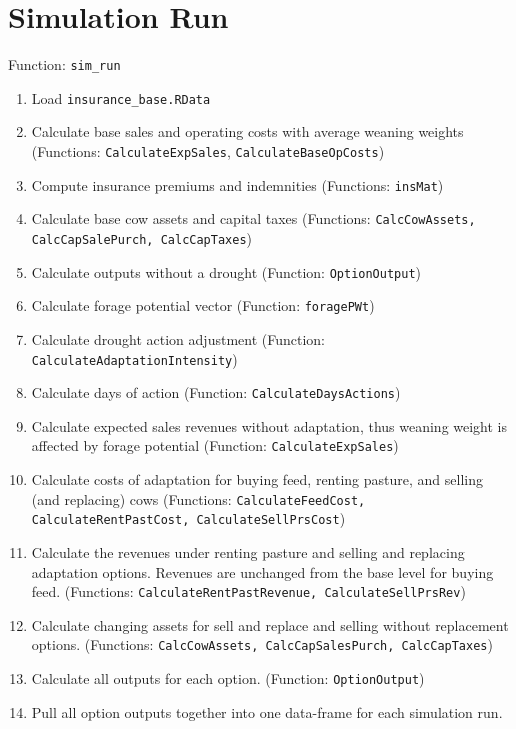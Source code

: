 \documentclass[11pt]{article}
\begin{document}
\section{Simulation Run}
Function: \verb!sim_run!
\begin{enumerate}
\item Load \verb!insurance_base.RData!
\item Calculate base sales and operating costs with average weaning weights (Functions: \verb!CalculateExpSales!, \verb!CalculateBaseOpCosts!)
\item Compute insurance premiums and indemnities (Functions: \verb!insMat!)
\item Calculate base cow assets and capital taxes (Functions: \verb!CalcCowAssets, CalcCapSalePurch, CalcCapTaxes!)
\item Calculate outputs without a drought (Function: \verb!OptionOutput!)
\item Calculate forage potential vector (Function: \verb!foragePWt!)
\item Calculate drought action adjustment (Function: \verb!CalculateAdaptationIntensity!)
\item Calculate days of action (Function: \verb!CalculateDaysActions!)
\item Calculate expected sales revenues without adaptation, thus weaning weight is affected by forage potential (Function: \verb!CalculateExpSales!)
\item Calculate costs of adaptation for buying feed, renting pasture, and selling (and replacing) cows (Functions: \verb!CalculateFeedCost, CalculateRentPastCost, CalculateSellPrsCost!)
\item Calculate the revenues under renting pasture and selling and replacing adaptation options. Revenues are unchanged from the base level for buying feed. (Functions: \verb!CalculateRentPastRevenue, CalculateSellPrsRev!)
\item Calculate changing assets for sell and replace and selling without replacement options. (Functions: \verb!CalcCowAssets, CalcCapSalesPurch, CalcCapTaxes!)
\item Calculate all outputs for each option. (Function: \verb!OptionOutput!)
\item Pull all option outputs together into one data-frame for each simulation run.
\end{enumerate}
\end{document}
